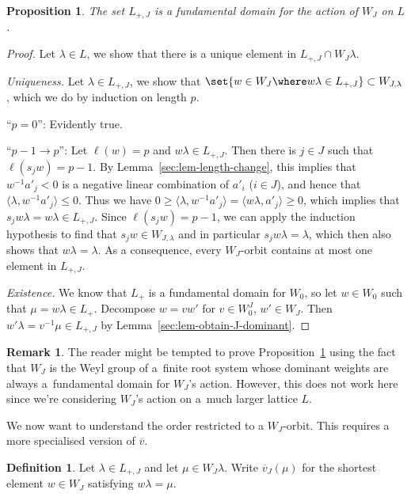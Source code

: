 \documentclass[pdftex]{sigma}
\newtheorem{Proposition}[Theorem]{Proposition}
\theoremstyle{definition}
\newtheorem{Definition}[Theorem]{Definition}
\newtheorem{Remark}[Theorem]{Remark}
\numberwithin{equation}{section}
\begin{document}
\begin{Proposition}\label{sec:prop-J-fundamental-domain}
 The set $L_{+,J}$ is a fundamental domain for the action of $W_J$ on $L$.
\end{Proposition}
\begin{proof}
 Let $\lambda\in L$, we show that there is a unique element in $L_{+,J}\cap W_J\lambda$.

{\it Uniqueness.} Let $\lambda\in L_{+,J}$, we show that
$
 \set{w\in W_J\where w\lambda\in L_{+,J}}\subset W_{J,\lambda}$,
 which we do by induction on length $p$.

``$p=0$'': Evidently true.

``$p-1\to p$'': Let $\ell(w)=p$ and $w\lambda\in L_{+,J}$. Then there is $j\in J$ such
 that $\ell(s_jw)=p-1$. By Lemma~\ref{sec:lem-length-change}, this
 implies that $w^{-1}a'_j<0$ is a negative
 linear combination of $a'_i$ ($i\in J$), and hence that
 $\big\langle \lambda, w^{-1}a'_j\big\rangle \le 0$. Thus we have
$
 0 \ge \big\langle \lambda, w^{-1}a'_j\big\rangle = \langle w\lambda, a'_j\rangle \ge 0$,
 which implies that $s_j w\lambda = w\lambda\in L_{+,J}$. Since $\ell(s_jw)=p-1$, we can apply the
 induction hypothesis to find that $s_jw\in W_{J,\lambda}$ and in particular $s_jw\lambda=\lambda$, which
 then also shows that $w\lambda=\lambda$. As a consequence, every $W_J$-orbit contains at most one element
 in $L_{+,J}$.

{\it Existence.} We know that $L_+$ is a fundamental domain for $W_0$, so let
 $w\in W_0$ such that $\mu=w\lambda\in L_+$. Decompose $w=vw'$ for $v\in W_0^J$, $w'\in W_J$. Then
$
 w'\lambda = v^{-1}\mu\in L_{+,J}
$
 by Lemma~\ref{sec:lem-obtain-J-dominant}.
\end{proof}

\begin{Remark}
 The reader might be tempted to prove Proposition~\ref{sec:prop-J-fundamental-domain} using the fact that $W_J$ is the Weyl group of
 a~finite root system whose dominant weights are always a~fundamental
 domain for $W_J$'s action. However, this does not work here since
 we're considering $W_J$'s action on a~much larger lattice $L$.
\end{Remark}

We now want to understand the order restricted to a $W_J$-orbit.
This requires a more specialised version of $\overline{v}$.

\begin{Definition}
 Let $\lambda\in L_{+,J}$ and let $\mu\in W_J\lambda$. Write
 $\overline{v}_J(\mu)$ for the shortest element $w\in W_J$ satisfying $w\lambda=\mu$.
\end{Definition}
\end{document}
